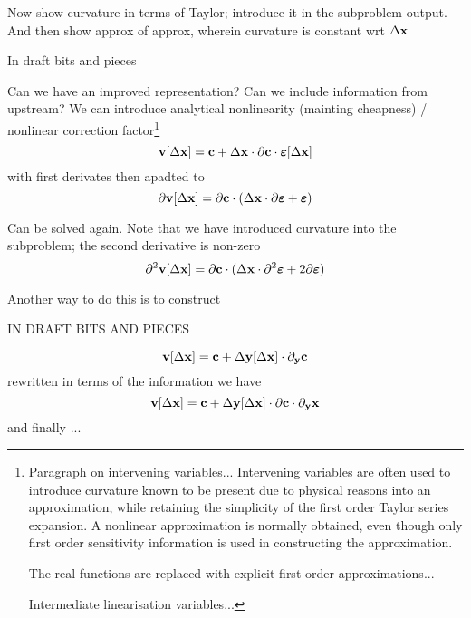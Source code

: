 \documentclass[11pt]{article}
\begin{document}
Now show curvature in terms of Taylor; introduce it in the subproblem output. And then show approx of approx, wherein curvature is constant wrt $\Delta \mathbf{x}$

\newpage

In draft bits and pieces

Can we have an improved representation? Can we include information from upstream? We can introduce analytical nonlinearity (mainting cheapness) / nonlinear correction factor\footnote{Paragraph on intervening variables... Intervening variables are often used to introduce curvature known to be present due to physical reasons into an approximation, while retaining the simplicity of the first order Taylor series expansion. A nonlinear
approximation is normally obtained, even though only
first order sensitivity information is used in constructing the approximation. 

The real functions are replaced with explicit first order approximations...

Intermediate linearisation variables...

}
\begin{equation}
\textbf{v}[\Delta \mathbf{x}] = \mathbf{c} + \Delta \mathbf{x} \cdot \partial \mathbf{c} \cdot \bm{\varepsilon}[\Delta \mathbf{x}]
\end{equation}
with first derivates then apadted to 
\begin{equation}
\partial \textbf{v}[\Delta \mathbf{x}] = \partial \mathbf{c} \cdot ( \Delta \mathbf{x} \cdot \partial \bm{\varepsilon} + \bm{\varepsilon})
\end{equation}

Can be solved again. Note that we have introduced curvature into the subproblem; the second derivative is non-zero
\begin{equation}
\partial^2 \textbf{v}[\Delta \mathbf{x}] = \partial \mathbf{c} \cdot ( \Delta \mathbf{x} \cdot \partial^2 \bm{\varepsilon} + 2 \partial \bm{\varepsilon})
\end{equation}

Another way to do this is to construct 


\newpage

IN DRAFT BITS AND PIECES

\begin{equation}
\textbf{v}[\Delta \mathbf{x}] = \mathbf{c} + \Delta \mathbf{y}[\Delta \mathbf{x}] \cdot \partial_{\mathbf{y}}\mathbf{c}
\end{equation}
rewritten in terms of the information we have
\begin{equation}
\textbf{v}[\Delta \mathbf{x}] = \mathbf{c} + \Delta \mathbf{y}[\Delta \mathbf{x}] \cdot \partial \mathbf{c} \cdot \partial_{\mathbf{y}} \mathbf{x}
\end{equation}
and finally ... 
\end{document}
